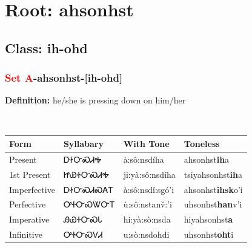 \needspace{4in}
\section*{Root: ahsonhst}
\nopagebreak
{}
\needspace{3in}
\subsection*{Class: ih-ohd}
\nopagebreak
\needspace{2in}
\subsubsection*{\textcolor{Red}{Set A}{-}\textbf{ahsonhst}{-}[ih-ohd]}
\nopagebreak
\textbf{Definition: } he/she is pressing down on him/her
\\[0.5em]
\begin{tabularx}{\textwidth}{l X X X}%
\toprule%
\textbf{Form}&\textbf{Syllabary}&\textbf{With Tone}&\textbf{Toneless}\\%
\midrule%
Present&ᎠᏐᏅᏍᏗᎭ&à:sô:nsdíha&ahsonhst\textbf{ih}a\\%
1st Present&ᏥᏯᏐᏅᏍᏗᎭ&ji:yà:sô:nsdíha&tsiyahsonhst\textbf{ih}a\\%
Imperfective&ᎠᏐᏅᏍᏗᏍᎪᎢ&à:sô:nsdǐ:sgó’i&ahsonhst\textbf{ihsk}o'i\\%
Perfective&ᎤᏐᏅᏍᏔᏅᎢ&ù:sô:nstanv̌:’i&uhsonhst\textbf{han}v'i\\%
Imperative&ᎯᏯᏐᏅᏍᏓ&hi:yà:sò:nsda&hiyahsonhst\textbf{a}\\%
Infinitive&ᎤᏐᏅᏍᏙᏗ&u:sò:nsdohdi&uhsonhst\textbf{oht}i\\%
\bottomrule%
\end{tabularx}
\\[1em]